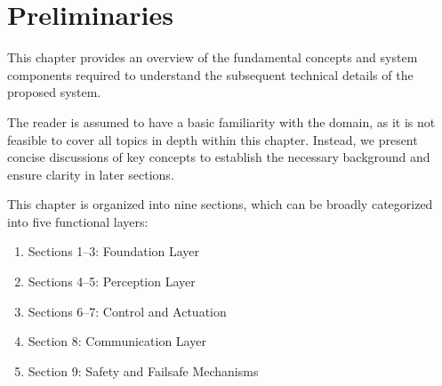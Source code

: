 \chapter{Preliminaries}
\label{chap:preliminary}

This chapter provides an overview of the fundamental concepts and system components required to understand the subsequent technical details of the proposed system.

The reader is assumed to have a basic familiarity with the domain, as it is not feasible to cover all topics in depth within this chapter. Instead, we present concise discussions of key concepts to establish the necessary background and ensure clarity in later sections.

This chapter is organized into nine sections, which can be broadly categorized into five functional layers:

\begin{enumerate}
    \item Sections 1--3: Foundation Layer
    \item Sections 4--5: Perception Layer
    \item Sections 6--7: Control and Actuation
    \item Section 8: Communication Layer
    \item Section 9: Safety and Failsafe Mechanisms
\end{enumerate}








